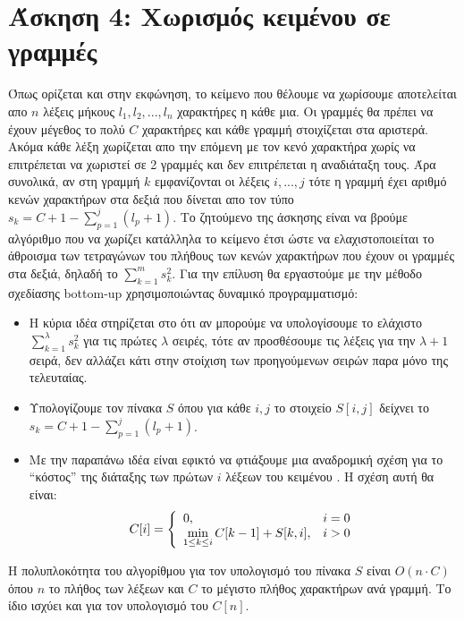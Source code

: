\documentclass[a4paper,12pt]{report}
\begin{document}
\section*{Άσκηση 4: Χωρισμός κειμένου σε γραμμές}
Όπως ορίζεται και στην εκφώνηση, το κείμενο που θέλουμε να χωρίσουμε αποτελείται απο $n$ λέξεις μήκους $l_1,l_2,...,l_n$ χαρακτήρες η κάθε μια. Οι γραμμές θα πρέπει να έχουν μέγεθος το πολύ $C$ χαρακτήρες και κάθε γραμμή στοιχίζεται στα αριστερά. Ακόμα κάθε λέξη χωρίζεται απο την επόμενη με τον κενό χαρακτήρα χωρίς να επιτρέπεται να χωριστεί σε 2 γραμμές και δεν επιτρέπεται η αναδιάταξη τους. Άρα συνολικά, αν στη γραμμή $k$ εμφανίζονται οι λέξεις $i,...,j$ τότε η γραμμή έχει αριθμό κενών χαρακτήρων στα δεξιά που δίνεται απο τον τύπο $s_k=C+1-\sum_{p=1}^{j}{(l_p+1)}$. Το ζητούμενο της άσκησης είναι να βρούμε αλγόριθμο που να χωρίζει κατάλληλα το κείμενο έτσι ώστε να ελαχιστοποιείται το άθροισμα των τετραγώνων του πλήθους των κενών χαρακτήρων που έχουν οι γραμμές στα δεξιά, δηλαδή το $\sum_{k=1}^{m}{s_k^2}$. Για την επίλυση θα εργαστούμε με την μέθοδο σχεδίασης bottom-up χρησιμοποιώντας δυναμικό προγραμματισμό:

\begin{itemize}
 \item Η κύρια ιδέα στηρίζεται στο ότι αν μπορούμε να υπολογίσουμε το ελάχιστο $\sum_{k=1}^{\lambda}{s_k^2}$ για τις πρώτες $\lambda$ σειρές, τότε αν προσθέσουμε τις λέξεις για την $\lambda+1$ σειρά, δεν αλλάζει κάτι στην στοίχιση των προηγούμενων σειρών παρα μόνο της τελευταίας.
 \item Υπολογίζουμε τον πίνακα $S$ όπου για κάθε $i,j$ το στοιχείο $S[i,j]$ δείχνει το $s_k=C+1-\sum_{p=1}^{j}{(l_p+1)}$.
 \item Με την παραπάνω ιδέα είναι εφικτό να φτιάξουμε μια αναδρομική σχέση για το ``κόστος'' της διάταξης των πρώτων $i$ λέξεων του κειμένου . Η σχέση αυτή θα είναι:
  $$
   C[i]=\left\{\begin{array}{l l}
           0, & i=0 \\
	  \displaystyle \min_{1 \leq k \leq i}C[k-1]+S[k,i], & i>0
          \end{array} \right.
  $$ 

\end{itemize}


H πολυπλοκότητα του αλγορίθμου για τον υπολογισμό του πίνακα $S$ είναι $O(n \cdot C)$ όπου $n$ το πλήθος των λέξεων και $C$ το μέγιστο πλήθος χαρακτήρων ανά γραμμή. Το ίδιο ισχύει και για τον υπολογισμό του $C[n]$.
\end{document}
